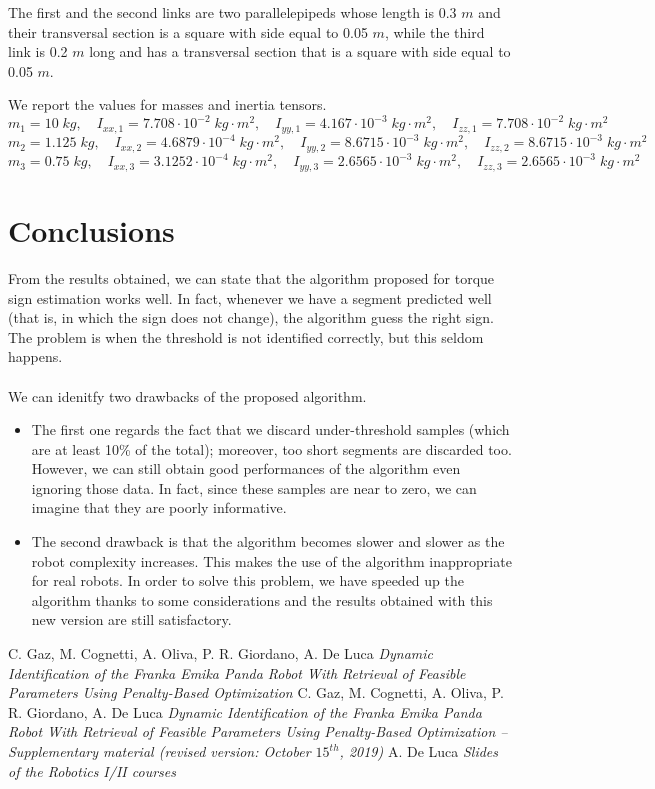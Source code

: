 \documentclass{article}
\begin{document}
The first and the second links are two parallelepipeds whose length is 0.3 $m$ and their transversal section is a square with side equal to 0.05 $m$, while the third link is 0.2 $m$ long and has a transversal section that is a square with side equal to 0.05 $m$.

We report the  values for masses and inertia tensors.
\[m_1 = 10 \;kg,\quad I_{xx,1} = 7.708\cdot 10^{-2}\;kg\cdot m^2,\quad I_{yy,1} = 4.167 \cdot 10^{-3}\;kg\cdot m^2,\quad I_{zz,1} = 7.708\cdot 10^{-2}\;kg\cdot m^2\]
\[ m_2 = 1.125\;kg,\quad I_{xx,2} = 4.6879\cdot10^{-4}\;kg\cdot m^2,\quad I_{yy,2} = 8.6715\cdot 10^{-3}\;kg\cdot m^2,\quad I_{zz,2} = 8.6715\cdot 10^{-3}\;kg\cdot m^2\]
\[m_3 = 0.75\;kg,\quad I_{xx,3} = 3.1252\cdot 10^{-4}\;kg\cdot m^2,\quad I_{yy,3} = 2.6565\cdot 10^{-3}\;kg\cdot m^2,\quad I_{zz,3} = 2.6565\cdot 10^{-3}\;kg\cdot m^2\]

\clearpage

\section{Conclusions}
From the results obtained, we can state that the algorithm proposed for torque sign estimation works well. In fact, whenever we have a segment predicted well (that is, in which the sign does not change), the algorithm guess the right  sign. The problem is when the threshold is not identified correctly, but this seldom happens. \\\\

We can idenitfy two drawbacks of the proposed algorithm. 
\begin{itemize}
\item The first one regards the fact that we discard under-threshold samples (which are at least 10\% of the total); moreover, too short segments are discarded too.  However,  we can still obtain good performances of the algorithm even ignoring those data. In fact, since these samples are near to zero, we can imagine that they are poorly informative.
\item The second drawback is that the algorithm becomes slower and slower as the robot complexity increases. This makes the use of the algorithm inappropriate for real robots. In order to solve this problem, we have speeded up the algorithm thanks to some considerations and the results obtained with this new version are still satisfactory.
\end{itemize}

\clearpage

\begin{thebibliography}{}
C. Gaz, M. Cognetti, A. Oliva, P. R. Giordano, A. De Luca
\emph {Dynamic Identification of the Franka Emika Panda Robot With Retrieval of Feasible Parameters Using Penalty-Based Optimization}
C. Gaz, M. Cognetti, A. Oliva, P. R. Giordano, A. De Luca
\emph {Dynamic Identification of the Franka Emika Panda Robot With Retrieval of Feasible Parameters Using Penalty-Based Optimization – Supplementary material (revised version: October $15^{th}$, 2019)}
A. De Luca
\emph {Slides of the Robotics I/II courses}
\end{thebibliography}
\end{document}
